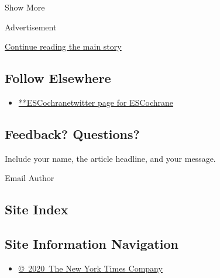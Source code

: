 Show More

Advertisement

\protect\hyperlink{after-mid2}{Continue reading the main story}

\hypertarget{follow-elsewhere}{%
\subsection{Follow Elsewhere}\label{follow-elsewhere}}

\begin{itemize}
\tightlist
\item
  \href{https://twitter.com/ESCochrane}{**ESCochranetwitter page for
  ESCochrane}
\end{itemize}

\hypertarget{feedback-questions}{%
\subsection{Feedback? Questions?}\label{feedback-questions}}

Include your name, the article headline, and your message.

Email Author

\hypertarget{site-index}{%
\subsection{Site Index}\label{site-index}}

\hypertarget{site-information-navigation}{%
\subsection{Site Information
Navigation}\label{site-information-navigation}}

\begin{itemize}
\tightlist
\item
  \href{https://help.nytimes3xbfgragh.onion/hc/en-us/articles/115014792127-Copyright-notice}{©~2020~The
  New York Times Company}
\end{itemize}

